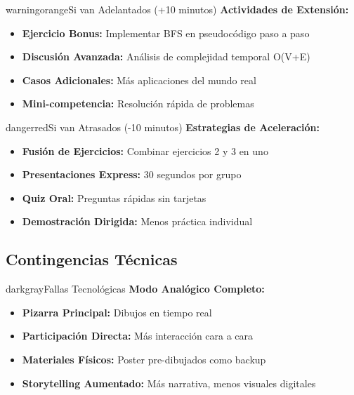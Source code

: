 \documentclass[12pt,a4paper]{article}
\begin{document}
	\begin{presentationbox}{warningorange}{Si van Adelantados (+10 minutos)}
		\textbf{Actividades de Extensión:}
		\begin{itemize}
			\item \textbf{Ejercicio Bonus:} Implementar BFS en pseudocódigo paso a paso
			\item \textbf{Discusión Avanzada:} Análisis de complejidad temporal O(V+E)
			\item \textbf{Casos Adicionales:} Más aplicaciones del mundo real
			\item \textbf{Mini-competencia:} Resolución rápida de problemas
		\end{itemize}
	\end{presentationbox}
	
	\begin{presentationbox}{dangerred}{Si van Atrasados (-10 minutos)}
		\textbf{Estrategias de Aceleración:}
		\begin{itemize}
			\item \textbf{Fusión de Ejercicios:} Combinar ejercicios 2 y 3 en uno
			\item \textbf{Presentaciones Express:} 30 segundos por grupo
			\item \textbf{Quiz Oral:} Preguntas rápidas sin tarjetas
			\item \textbf{Demostración Dirigida:} Menos práctica individual
		\end{itemize}
	\end{presentationbox}
	
	\subsection*{Contingencias Técnicas}
	
	\begin{presentationbox}{darkgray}{Fallas Tecnológicas}
		\textbf{Modo Analógico Completo:}
		\begin{itemize}
			\item \textbf{Pizarra Principal:} Dibujos en tiempo real
			\item \textbf{Participación Directa:} Más interacción cara a cara
			\item \textbf{Materiales Físicos:} Poster pre-dibujados como backup
			\item \textbf{Storytelling Aumentado:} Más narrativa, menos visuales digitales
		\end{itemize}
	\end{presentationbox}
	
\end{document}
